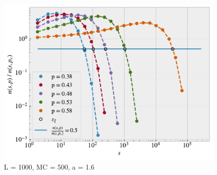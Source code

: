 \documentclass[reprint, amsmath, amssymb, aps]{revtex4-2}
\begin{document}
\begin{figure}[H]
  \includegraphics[width=\linewidth]{figures/h_n_over_nc.pdf}
  \caption{L = 1000, MC = 500, a = 1.6}
  \label{fig:h_n_over_nc.pdf}
\end{figure}
\end{document}
